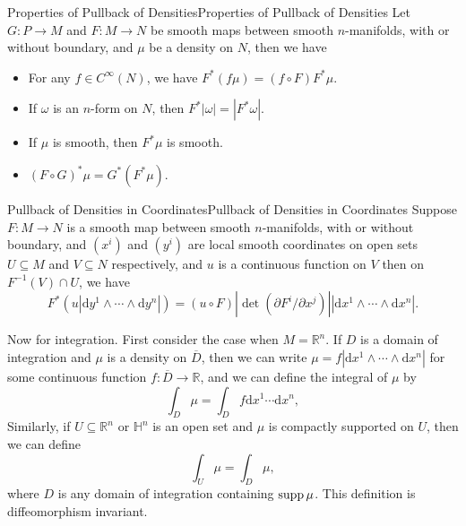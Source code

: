\documentclass[../main.tex]{subfiles}
\begin{document}
\begin{proposition}{Properties of Pullback of Densities}{Properties of Pullback of Densities}
  Let $G: P \to M$ and $F: M \to N$ be smooth maps between smooth $n$-manifolds, with or without boundary, and $\mu$ be a density on $N$, then we have
  \begin{itemize}
    \item For any $f \in C^\infty (N)$, we have $F^* (f \mu) = (f \circ F) F^* \mu$.
    \item If $\omega$ is an $n$-form on $N$, then $F^* |\omega| = |F^* \omega|$.
    \item If $\mu$ is smooth, then $F^* \mu$ is smooth.
    \item $(F \circ G)^* \mu = G^* (F^* \mu)$.
  \end{itemize}
\end{proposition}
\begin{proposition}{Pullback of Densities in Coordinates}{Pullback of Densities in Coordinates}
  Suppose $F: M \to N$ is a smooth map between smooth $n$-manifolds, with or without boundary, and $(x^i)$ and $(y^i)$ are local smooth coordinates on open sets $U \subseteq M$ and $V \subseteq N$ respectively, and $u$ is a continuous function on $V$ then on $F^{-1}(V) \cap U$, we have
  \begin{equation}
    F^* (u | \mathrm{d} y^1 \wedge \cdots \wedge \mathrm{d} y^n|) = (u \circ F) |\det (\partial F^i / \partial x^j)| |\mathrm{d} x^1 \wedge \cdots \wedge \mathrm{d} x^n|.
  \end{equation}
\end{proposition}

Now for integration. First consider the case when $M = \mathbb{R}^n$. If $D$ is a domain of integration and $\mu$ is a density on $\overline{D}$, then we can write $\mu = f |\mathrm{d} x^1 \wedge \cdots \wedge \mathrm{d} x^n|$ for some continuous function $f: \overline{D} \to \mathbb{R}$, and we can define the integral of $\mu$ by
\begin{equation}
  \int_D \mu = \int_D f \mathrm{d} x^1 \cdots \mathrm{d} x^n,
\end{equation}
Similarly, if $U \subseteq \mathbb{R}^n$ or $\mathbb{H}^n$ is an open set and $\mu$ is compactly supported on $U$, then we can define
\begin{equation}
  \int_U \mu = \int_D \mu,
\end{equation}
where $D$ is any domain of integration containing $\operatorname{supp} \mu$. This definition is diffeomorphism invariant.
\end{document}
